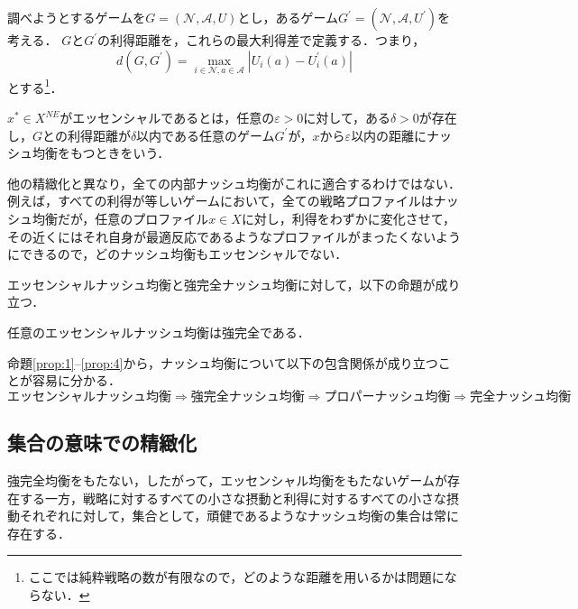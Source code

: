 \documentclass{jsreport}
\begin{document}
調べようとするゲームを$G = (\mathcal{N}, \mathcal{A}, U)$とし，あるゲーム$G^{\prime} = (\mathcal{N}, \mathcal{A}, U^{\prime})$を考える．
$G$と$G^{\prime}$の利得距離を，これらの最大利得差で定義する．つまり，
\begin{equation}
  d(G, G^{\prime}) = \max_{i \in \mathcal{N}, a \in \mathcal{A}} |U_i(a) - U_i^{\prime}(a)| \nonumber
\end{equation}
とする\footnote{ここでは純粋戦略の数が有限なので，どのような距離を用いるかは問題にならない．}．

\begin{screen}
  \begin{defi}
    $x^{*} \in X^{NE}$がエッセンシャルであるとは，任意の$\varepsilon > 0$に対して，ある$\delta > 0$が存在し，$G$との利得距離が$\delta$以内である任意のゲーム$G^{\prime}$が，$x$から$\varepsilon$以内の距離にナッシュ均衡をもつときをいう．
  \end{defi}
\end{screen}

他の精緻化と異なり，全ての内部ナッシュ均衡がこれに適合するわけではない．
例えば，すべての利得が等しいゲームにおいて，全ての戦略プロファイルはナッシュ均衡だが，任意のプロファイル$x \in X$に対し，利得をわずかに変化させて，その近くにはそれ自身が最適反応であるようなプロファイルがまったくないようにできるので，どのナッシュ均衡もエッセンシャルでない．

エッセンシャルナッシュ均衡と強完全ナッシュ均衡に対して，以下の命題が成り立つ．
\begin{screen}
  \begin{prop}\label{prop:4}
    任意のエッセンシャルナッシュ均衡は強完全である．
  \end{prop}
\end{screen}

命題\ref{prop:1}--\ref{prop:4}から，ナッシュ均衡について以下の包含関係が成り立つことが容易に分かる．
\begin{equation}
  エッセンシャルナッシュ均衡 \Rightarrow 強完全ナッシュ均衡 \Rightarrow プロパーナッシュ均衡 \Rightarrow 完全ナッシュ均衡 \nonumber
\end{equation}

\subsection{集合の意味での精緻化}
強完全均衡をもたない，したがって，エッセンシャル均衡をもたないゲームが存在する一方，戦略に対するすべての小さな摂動と利得に対するすべての小さな摂動それぞれに対して，集合として，頑健であるようなナッシュ均衡の集合は常に存在する．
\end{document}
